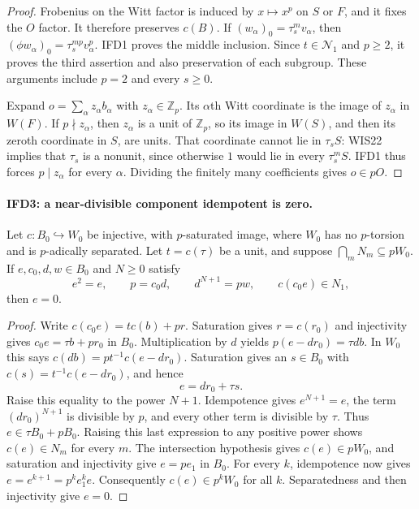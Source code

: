 \begin{proof}
Frobenius on the Witt factor is induced by $x\mapsto x^p$ on $S$ or
$F$, and it fixes the $O$ factor. It therefore preserves $c(B)$.
If $(w_\alpha)_0=\tau_s^m v_\alpha$, then
$(\phi w_\alpha)_0=\tau_s^{mp}v_\alpha^p$.
IFD1 proves the middle inclusion. Since $t\in\mathcal N_1$ and
$p\geq2$, it proves the third assertion and also preservation of
each subgroup. These arguments include $p=2$ and every $s\geq0$.

Expand $o=\sum_\alpha z_\alpha b_\alpha$ with $z_\alpha\in\mathbb Z_p$.
Its $\alpha$th Witt coordinate is the image of $z_\alpha$ in $W(F)$.
If $p\nmid z_\alpha$, then $z_\alpha$ is a unit of $\mathbb Z_p$,
so its image in $W(S)$, and then its zeroth coordinate in $S$, are
units. That coordinate cannot lie in $\tau_s S$: WIS22 implies
that $\tau_s$ is a nonunit, since otherwise $1$ would lie in every
$\tau_s^mS$. IFD1 thus forces $p\mid z_\alpha$ for every $\alpha$.
Dividing the finitely many coefficients gives $o\in pO$.
\end{proof}

\paragraph{IFD3: a near-divisible component idempotent is zero.}
\label{claim:IFD3}
Let $c:B_0\hookrightarrow W_0$ be injective, with $p$-saturated image,
where $W_0$ has no $p$-torsion and is $p$-adically separated.
Let $t=c(\tau)$ be a unit, and suppose $\bigcap_mN_m\subseteq pW_0$.
If $e,c_0,d,w\in B_0$ and $N\geq0$ satisfy
\[
 e^2=e,\qquad p=c_0d,\qquad d^{N+1}=pw,
                 \qquad c(c_0e)\in N_1,
                                                               \tag{IFD.5}
\]
then $e=0$.

\begin{proof}
Write $c(c_0e)=tc(b)+pr$. Saturation gives $r=c(r_0)$ and
injectivity gives $c_0e=\tau b+pr_0$ in $B_0$.
Multiplication by $d$ yields
$p(e-dr_0)=\tau db$. In $W_0$ this says
$c(db)=p t^{-1}c(e-dr_0)$. Saturation gives an $s\in B_0$ with
$c(s)=t^{-1}c(e-dr_0)$, and hence
\[
                              e=dr_0+\tau s.
\]
Raise this equality to the power $N+1$. Idempotence gives
$e^{N+1}=e$, the term $(dr_0)^{N+1}$ is divisible by $p$, and every
other term is divisible by $\tau$. Thus $e\in\tau B_0+pB_0$.
Raising this last expression to any positive power shows
$c(e)\in N_m$ for every $m$. The intersection hypothesis gives
$c(e)\in pW_0$, and saturation and injectivity give $e=pe_1$ in $B_0$.
For every $k$, idempotence now gives
$e=e^{k+1}=p^ke_1^ke$. Consequently $c(e)\in p^kW_0$ for all $k$.
Separatedness and then injectivity give $e=0$.
\end{proof}

